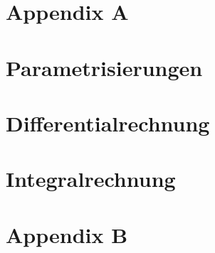 \documentclass[8pt]{mpscheatsheet}
\begin{document}
    \section{Appendix A}
    
    
    
    
    
    
    
    
    

    \newpage

    \section{Parametrisierungen}
        
        
    \section{Differentialrechnung}
        
        
        
        
        
    \section{Integralrechnung}
        
        
        
        
        
        
        
        
        
        \vfill \null \columnbreak
    
    \section{Appendix B}
        
        \vfill \null \columnbreak
        
   
\end{document}
